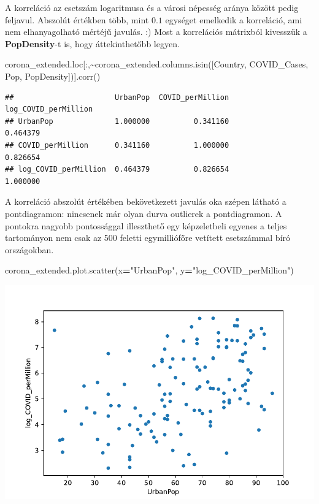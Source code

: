 \documentclass[
]{book}
\newenvironment{Shaded}{\begin{snugshade}}{\end{snugshade}}
\newcommand{\NormalTok}[1]{#1}
\newcommand{\OperatorTok}[1]{\textcolor[rgb]{0.81,0.36,0.00}{\textbf{#1}}}
\newcommand{\StringTok}[1]{\textcolor[rgb]{0.31,0.60,0.02}{#1}}
\begin{document}
A korreláció az esetszám logaritmusa és a városi népesség aránya között pedig feljavul. Abszolút értékben több, mint \(0.1\) egységet emelkedik a korreláció, ami nem elhanyagolható mértéjű javulás. :) Most a korrelációs mátrixból kivesszük a \textbf{PopDensity}-t is, hogy áttekinthetőbb legyen.

\begin{Shaded}
\begin{Highlighting}[]
\NormalTok{corona\_extended.loc[:,}\OperatorTok{\textasciitilde{}}\NormalTok{corona\_extended.columns.isin([}\StringTok{\textquotesingle{}Country\textquotesingle{}}\NormalTok{, }\StringTok{\textquotesingle{}COVID\_Cases\textquotesingle{}}\NormalTok{, }\StringTok{\textquotesingle{}Pop\textquotesingle{}}\NormalTok{, }\StringTok{\textquotesingle{}PopDensity\textquotesingle{}}\NormalTok{])].corr()}
\end{Highlighting}
\end{Shaded}

\begin{verbatim}
##                       UrbanPop  COVID_perMillion  log_COVID_perMillion
## UrbanPop              1.000000          0.341160              0.464379
## COVID_perMillion      0.341160          1.000000              0.826654
## log_COVID_perMillion  0.464379          0.826654              1.000000
\end{verbatim}

A korreláció abszolút értékében bekövetkezett javulás oka szépen látható a pontdiagramon: nincsenek már olyan durva outlierek a pontdiagramon. A pontokra nagyobb pontossággal illeszthető egy képzeletbeli egyenes a teljes tartományon nem csak az 500 feletti egymilliófőre vetített esetszámmal bíró országokban.

\begin{Shaded}
\begin{Highlighting}[]
\NormalTok{corona\_extended.plot.scatter(x}\OperatorTok{=}\StringTok{"UrbanPop"}\NormalTok{, y}\OperatorTok{=}\StringTok{"log\_COVID\_perMillion"}\NormalTok{)}
\end{Highlighting}
\end{Shaded}

\includegraphics{_main_files/figure-latex/unnamed-chunk-130-23.pdf}
\end{document}
